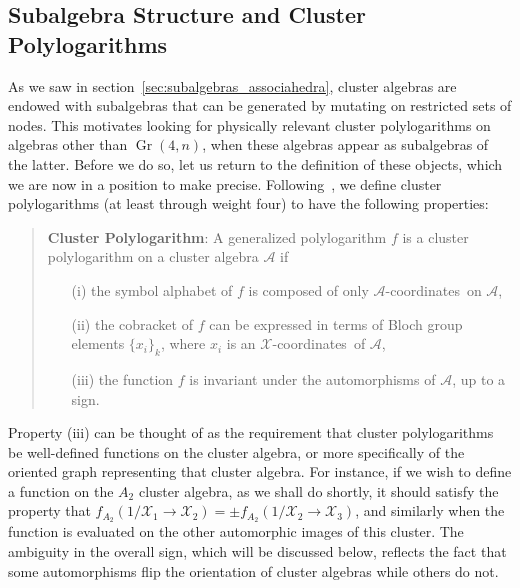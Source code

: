 \documentclass[12pt]{article}
\DeclareMathOperator{\Gr}{Gr}
\def\x{\mathcal{X}}
\def\xcoords{$\mathcal{X}$-coordinates}
\def\a{\mathcal{A}}
\def\acoords{$\mathcal{A}$-coordinates}
\begin{document}
\subsection{Subalgebra Structure and Cluster Polylogarithms}

As we saw in section~\ref{sec:subalgebras_associahedra}, cluster algebras are endowed with subalgebras that can be generated by mutating on restricted sets of nodes. This motivates looking for physically relevant cluster polylogarithms on algebras other than $\Gr(4,n)$, when these algebras appear as subalgebras of the latter. Before we do so, let us return to the definition of these objects, which we are now in a position to make precise. Following~\cite{Golden:2014xqa}, we define cluster polylogarithms (at least through weight four) to have the following properties:
\begin{quote}
{\bf Cluster Polylogarithm}: A generalized polylogarithm $f$ is a cluster polylogarithm on a cluster algebra $\a$ if
\vspace{-.2cm}
 \begin{itemize}
 \item[(i)] the symbol alphabet of $f$ is composed of only \acoords\ on $\a$, 
 \item[(ii)] the cobracket of $f$ can be expressed in terms of Bloch group elements $\{x_i \}_k$, where $x_i$ is an \xcoords\ of $\a$,
 \item[(iii)] the function $f$ is invariant under the automorphisms of $\a$, up to a sign.
 \end{itemize}
\end{quote}
Property (iii) can be thought of as the requirement that cluster polylogarithms be well-defined functions on the cluster algebra, or more specifically of the oriented graph representing that cluster algebra. For instance, if we wish to define a function on the $A_2$ cluster algebra, as we shall do shortly, it should satisfy the property that $f_{A_2}(1/\x_1\to\x_2)=\pm f_{A_2}(1/\x_2\to\x_3)$, and similarly when the function is evaluated on the other automorphic images of this cluster. The ambiguity in the overall sign, which will be discussed below, reflects the fact that some automorphisms flip the orientation of cluster algebras while others do not.
\end{document}
